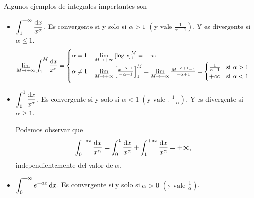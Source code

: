 \begin{example}
    Algunos ejemplos de integrales importantes son
    \begin{itemize}
        \item $\displaystyle \int^{+\infty}_1 \frac{\dif x}{x^\alpha}$. Es
            convergente si y solo si $\alpha > 1$ $\left(\text{y vale }
            \frac{1}{\alpha-1}\right)$. Y es divergente si $\alpha \leq 1$.
            \[
                \lim_{M \to +\infty} \int^M_1 \frac{\dif x}{x^\alpha} =
                \begin{cases}
                    \alpha = 1 \quad \lim\limits_{M \to +\infty}
                    \left[\log x \right]^M_1 = + \infty \\
                    \alpha \neq 1 \quad \lim\limits_{M \to +\infty}
                    \left[\frac{x^{-\alpha+1}}{-\alpha+1}
                    \right]^M_1 = \lim\limits_{M \to +\infty}
                    \frac{M^{-\alpha+1}-1}{-\alpha+1}=\begin{cases}
                        \frac{1}{\alpha-1} \quad
                        \text{si $\alpha > 1$} \\
                        +\infty \quad \text{si $\alpha < 1$}
                    \end{cases}
                \end{cases}
            \]
        \item $\displaystyle \int^1_0 \frac{\dif x}{x^\alpha}$. Es convergente
            si y solo si $\alpha < 1$ $\left(\text{y vale } \frac{1}{1-\alpha
            }\right)$. Y es divergente si $\alpha \geq 1$.

            Podemos observar que
            \[
                \int^{+\infty}_0 \frac{\dif x}{x^\alpha} = \int^1_0
                \frac{\dif x}{x^\alpha} + \int^{+\infty}_1
                \frac{\dif x}{x^\alpha} = +\infty,
            \]
            independientemente del valor de $\alpha$.
        \item $\displaystyle  \int^{+\infty}_0 e^{-ax} \dif x$. Es convergente
            si y solo si $\alpha > 0$ $\left(\text{y vale }\frac{1}{\alpha}\right)$.
    \end{itemize}
\end{example}


